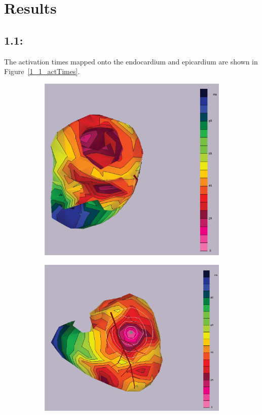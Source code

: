 \documentclass[12pt]{article}
\begin{document}
 
\section{Results}
\subsection{1.1: }
The activation times mapped onto the endocardium and epicardium are shown in Figure~\ref{1_1_actTimes}.

\begin{figure}[H]
	\begin{subfigure}{.5\textwidth}
		\centering
		\includegraphics[width=.95\linewidth]{Figures/1_1_actTimes_1.png}
		\caption{}
		
	\end{subfigure}%
	\begin{subfigure}{.5\textwidth}
		\centering
		\includegraphics[width=.95\linewidth]{Figures/1_1_actTimes_2.png}
		\caption{}
		

\end{subfigure}
\end{figure}
\end{document}
